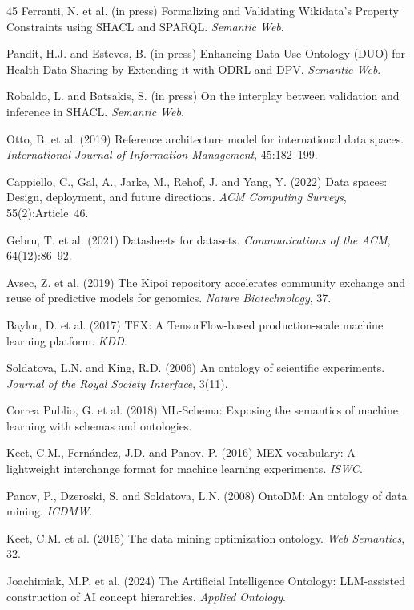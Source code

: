 \documentclass[Afour,sagev,times]{sagej}
\begin{document}
\begin{thebibliography}{45}
 Ferranti, N. et al. (in press) Formalizing and Validating Wikidata's Property Constraints using SHACL and SPARQL. \emph{Semantic Web}.

 Pandit, H.J. and Esteves, B. (in press) Enhancing Data Use Ontology (DUO) for Health-Data Sharing by Extending it with ODRL and DPV. \emph{Semantic Web}.

 Robaldo, L. and Batsakis, S. (in press) On the interplay between validation and inference in SHACL. \emph{Semantic Web}.

 Otto, B. et al. (2019) Reference architecture model for international data spaces. \emph{International Journal of Information Management}, 45:182--199.

 Cappiello, C., Gal, A., Jarke, M., Rehof, J. and Yang, Y. (2022) Data spaces: Design, deployment, and future directions. \emph{ACM Computing Surveys}, 55(2):Article~46.

 Gebru, T. et al. (2021) Datasheets for datasets. \emph{Communications of the ACM}, 64(12):86--92.

 Avsec, Z. et al. (2019) The Kipoi repository accelerates community exchange and reuse of predictive models for genomics. \emph{Nature Biotechnology}, 37.

 Baylor, D. et al. (2017) TFX: A TensorFlow-based production-scale machine learning platform. \emph{KDD}.

 Soldatova, L.N. and King, R.D. (2006) An ontology of scientific experiments. \emph{Journal of the Royal Society Interface}, 3(11).

 Correa Publio, G. et al. (2018) ML-Schema: Exposing the semantics of machine learning with schemas and ontologies.

 Keet, C.M., Fernández, J.D. and Panov, P. (2016) MEX vocabulary: A lightweight interchange format for machine learning experiments. \emph{ISWC}.

 Panov, P., Dzeroski, S. and Soldatova, L.N. (2008) OntoDM: An ontology of data mining. \emph{ICDMW}.

 Keet, C.M. et al. (2015) The data mining optimization ontology. \emph{Web Semantics}, 32.

 Joachimiak, M.P. et al. (2024) The Artificial Intelligence Ontology: LLM-assisted construction of AI concept hierarchies. \emph{Applied Ontology}.


\end{thebibliography}
\end{document}
